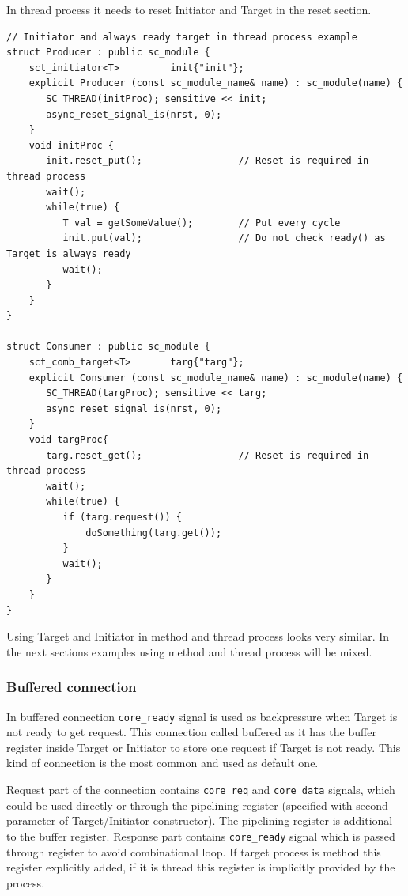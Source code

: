 In thread process it needs to reset Initiator and Target in the reset section.
\begin{lstlisting}[style=mycpp]
// Initiator and always ready target in thread process example
struct Producer : public sc_module {
    sct_initiator<T>         init{"init"};
    explicit Producer (const sc_module_name& name) : sc_module(name) {
       SC_THREAD(initProc); sensitive << init;
       async_reset_signal_is(nrst, 0);
    } 
    void initProc {
       init.reset_put();                 // Reset is required in thread process
       wait();
       while(true) {
          T val = getSomeValue();        // Put every cycle
          init.put(val);                 // Do not check ready() as Target is always ready
          wait();				   
       }
    }
}

struct Consumer : public sc_module {
    sct_comb_target<T>       targ{"targ"};   
    explicit Consumer (const sc_module_name& name) : sc_module(name) {
       SC_THREAD(targProc); sensitive << targ;
       async_reset_signal_is(nrst, 0);
    } 
    void targProc{
       targ.reset_get();                 // Reset is required in thread process
       wait();
       while(true) {
          if (targ.request()) {         
              doSomething(targ.get());
          }
          wait();
       }
    }
}
\end{lstlisting}
Using Target and Initiator in method and thread process looks very similar. In the next sections examples using method and thread process will be mixed.

\subsubsection{Buffered connection}

In buffered connection {\tt core\_ready} signal is used as backpressure when Target is not ready to get request. This connection called buffered as it has the buffer register inside Target or Initiator to store one request if Target is not ready. This kind of connection is the most common and used as default one.

Request part of the connection contains {\tt core\_req} and {\tt core\_data} signals, which could be used directly or through the pipelining register (specified with second parameter of Target/Initiator constructor). The pipelining register is additional to the buffer register. Response part contains {\tt core\_ready} signal which is passed through register to avoid combinational loop. If target process is method this register explicitly added, if it is thread this register is implicitly provided by the process.


